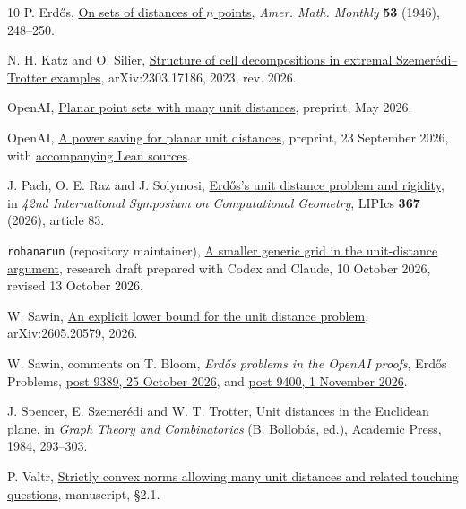 \documentclass[11pt,letterpaper,oneside,reqno]{amsart}
\theoremstyle{definition}
\begin{document}
\begin{thebibliography}{10}
 P. Erd\H{o}s, \href{https://doi.org/10.1080/00029890.1946.11991674}
{On sets of distances of \(n\) points}, \emph{Amer. Math. Monthly}
\textbf{53} (1946), 248--250.

 N. H. Katz and O. Silier,
\href{https://arxiv.org/abs/2303.17186v2}{Structure of cell decompositions
in extremal Szemer\'edi--Trotter examples}, arXiv:2303.17186,
2023, rev. 2026.

 OpenAI,
\href{https://cdn.openai.com/pdf/74c24085-19b0-4534-9c90-465b8e29ad73/unit-distance-proof.pdf}
{Planar point sets with many unit distances}, preprint, May 2026.

 OpenAI,
\href{https://github.com/openai/math/blob/adc7f1241b42e322a6451854ab7e4b4c146bf78a/preprints/A-power-saving-for-planar-unit-distances-September-23-2026/paper.pdf}
{A power saving for planar unit distances}, preprint, 23 September 2026,
with \href{https://github.com/openai/math/tree/adc7f1241b42e322a6451854ab7e4b4c146bf78a/lean/OAI/Geometry/UnitDistances}
{accompanying Lean sources}.

 J. Pach, O. E. Raz and J. Solymosi,
\href{https://doi.org/10.4230/LIPIcs.SoCG.2026.83}{Erd\H{o}s's unit
distance problem and rigidity}, in \emph{42nd International Symposium
on Computational Geometry}, LIPIcs \textbf{367} (2026), article 83.

 \texttt{rohanarun} (repository maintainer),
\href{https://github.com/rohanarun/unit-distance-grid-refinement/tree/4e7b3af0a46a7127a57019a0ab6d76fa2b55fe2e}
{A smaller generic grid in the unit-distance argument}, research draft
prepared with Codex and Claude, 10 October 2026, revised 13 October 2026.

 W. Sawin, \href{https://arxiv.org/abs/2605.20579}
{An explicit lower bound for the unit distance problem},
arXiv:2605.20579, 2026.

 W. Sawin, comments on T. Bloom,
\emph{Erd\H{o}s problems in the OpenAI proofs}, Erd\H{o}s Problems,
\href{https://www.erdosproblems.com/forum/thread/blog:10\#post-9389}
{post 9389, 25 October 2026}, and
\href{https://www.erdosproblems.com/forum/thread/blog:10\#post-9400}
{post 9400, 1 November 2026}.

 J. Spencer, E. Szemer\'edi and W. T. Trotter,
Unit distances in the Euclidean plane, in \emph{Graph Theory and
Combinatorics} (B. Bollob\'as, ed.), Academic Press, 1984, 293--303.

 P. Valtr,
\href{https://kam.mff.cuni.cz/~valtr/n.pdf}{Strictly convex norms allowing
many unit distances and related touching questions}, manuscript, \S2.1.
\end{thebibliography}
\end{document}
